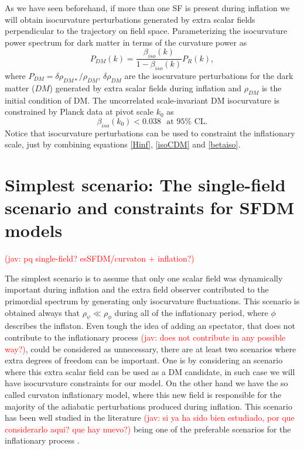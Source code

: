 \documentclass[amssymb,twocolumn,prd,nofootinbib,showpacs]{revtex4-1}
\newcommand{\jav}[1]{\textcolor{red}{(jav: #1)}}
\begin{document}
As we have seen beforehand, if more than one SF is present during inflation we will obtain isocurvature 
perturbations generated by extra scalar fields perpendicular to the trajectory on field space. 
%
Parameterizing the isocurvature power spectrum for dark matter in terms of the curvature power as
%
\begin{equation}\label{isoCDM}
P_{DM}(k) = \frac{\beta_{iso}(k)}{1-\beta_{iso}(k)}P_R(k),
\end{equation}
%
where $P_{DM}=\delta \rho_{DM*}/\rho_{DM}$, $\delta\rho_{DM}$ are the isocurvature 
perturbations for the dark matter ($DM$) generated by extra scalar fields during inflation and $\rho_{DM}$ 
is the initial condition of DM. 
The uncorrelated scale-invariant DM isocurvature is constrained by Planck data \cite{const1,const2} at pivot scale $k_0$ as
%
\begin{equation}\label{betaiso}
\beta_{iso}(k_0)<0.038 \ \ \ \text{at $95\%$ CL}.
\end{equation}
%
Notice that isocurvature perturbations can be used to constraint the inflationary scale, 
just by combining equations \eqref{Hinf}, \eqref{isoCDM} and \eqref{betaiso}.
%
%
%
%
\section{Simplest scenario: The single-field scenario and constraints for SFDM models}\label{simplest}
 \jav{pq single-field? esSFDM/curvaton + inflation?}

The simplest scenario is to assume that only one scalar field was dynamically important during inflation and 
the extra field observer contributed to the primordial spectrum by generating only isocurvature fluctuations. 
%
This scenario is obtained always that $\rho_{\psi}\ll \rho_{\phi}$ during all of the inflationary period, 
where $\phi$ describes the inflaton. 
%
Even tough the idea of adding an spectator, that does not contribute to the inflationary process 
\jav{does not contribute in any possible way?}, could be considered as unnecessary, there are at least 
two scenarios where  extra degrees of freedom can be important. 
%
One is by considering an scenario where this extra scalar field can be used as a DM candidate, 
in such case we will have isocurvature constraints for our model. On the other hand we have the so 
called curvaton inflationary model, where this new field is responsible for the majority of the adiabatic 
perturbations produced during inflation. This scenario has been well studied in the literature \jav{si ya ha sido bien estudiado,
por que considerarlo aqui? que hay nuevo?} being 
one of the preferable scenarios for the inflationary process \cite{curvaton15,curvaton16}. 
\end{document}

